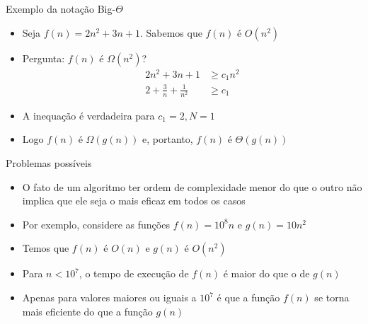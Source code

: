 \begin{frame}{Exemplo da notação Big-$\Theta$}
	\begin{itemize}

		\item Seja $f(n) = 2n^2 + 3n + 1$. {Sabemos} que $f(n)$ 
		é $O(n^2)$

		\item {Pergunta}: $f(n)$ é $\Omega(n^2)$?
		\begin{align*}
			2n^2 + 3n + 1 & \geq  c_1n^2 \\
			2 + \frac{3}{n} + \frac{1}{n^2} & \geq  c_1
		\end{align*}
		
		\item A inequação é {verdadeira} para $c_1 = 2, N = 1$ 

		\item Logo $f(n)$ é $\Omega(g(n))$ e, {portanto}, $f(n)$ 
		é $\Theta(g(n))$

	\end{itemize}

\end{frame}

\begin{frame}[fragile]{Problemas possíveis}

	\begin{itemize}
		\item O fato de um algoritmo ter ordem de complexidade 
		{menor} do que o outro não implica que ele seja o 
		{mais eficaz} em todos os casos

		\item Por exemplo, considere as funções $f(n) = 10^8n$ e 
		$g(n) = 10n^2$ 
	
		\item Temos que $f(n)$ é $O(n)$ e $g(n)$ é $O(n^2)$

		\item Para $n < 10^7$, o {tempo de execução} de $f(n)$ é 
		{maior} do que o de $g(n)$

        \item Apenas para valores maiores ou iguais a $10^7$ é que a função $f(n)$ se
        torna mais eficiente do que a função $g(n)$
	\end{itemize}

\end{frame}
 
